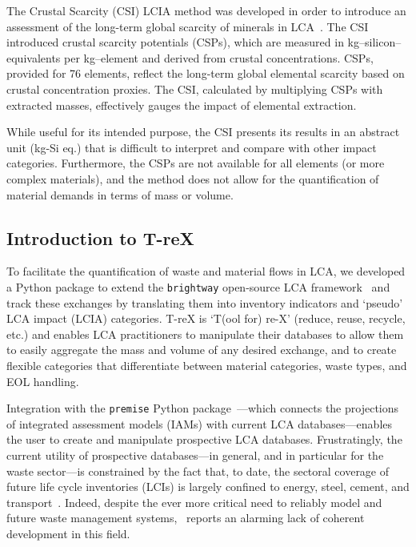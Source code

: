 \documentclass[a4paper,fleqn]{cas-dc}
\begin{document}
The Crustal Scarcity (CSI) LCIA method was developed in order to introduce an assessment of the long-term global scarcity of minerals in LCA~\citep{arvidsson2020csi}. The CSI introduced crustal scarcity potentials (CSPs), which are measured in kg--silicon--equivalents per kg--element and derived from crustal concentrations. CSPs, provided for 76 elements, reflect the long-term global elemental scarcity based on crustal concentration proxies. The CSI, calculated by multiplying CSPs with extracted masses, effectively gauges the impact of elemental extraction.

While useful for its intended purpose, the CSI presents its results in an abstract unit (kg-Si eq.) that is difficult to interpret and compare with other impact categories. Furthermore, the CSPs are not available for all elements (or more complex materials), and the method does not allow for the quantification of material demands in terms of mass or volume.

\subsection{Introduction to T-reX}\label{sec:intro-trex}

To facilitate the quantification of waste and material flows in LCA, we developed a Python package to extend the \texttt{brightway} open-source LCA framework~\citep{mutel2017brightway} and track these exchanges by translating them into inventory indicators and `pseudo' LCA impact (LCIA) categories. T-reX is `T(ool for) re-X' (reduce, reuse, recycle, etc.) and enables LCA practitioners to manipulate their databases to allow them to easily aggregate the mass and volume of any desired exchange, and to create flexible categories that differentiate between material categories, waste types, and EOL handling.

Integration with the \texttt{premise} Python package~\citep{sacchi2022premise}---which connects the projections of integrated assessment models (IAMs) with current LCA databases---enables the user to create and manipulate prospective LCA databases. Frustratingly, the current utility of prospective databases---in general, and in particular for the waste sector---is constrained by the fact that, to date, the sectoral coverage of future life cycle inventories (LCIs) is largely confined to energy, steel, cement, and transport~\citep{sacchi2023premisedocs}. Indeed, despite the ever more critical need to reliably model and future waste management systems,~\cite{bisinella2024wastelca} reports an alarming lack of coherent development in this field.
\end{document}
